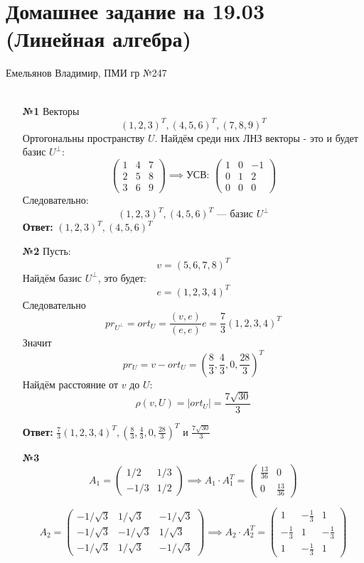 \documentclass[a4paper]{article}
\newcommand{\mat}[1]{\begin{pmatrix} #1 \end{pmatrix}}
\renewcommand{\f}[2]{\frac{#1}{#2}}
\begin{document}
\section*{Домашнее задание на 19.03 (Линейная алгебра)}
 {\large Емельянов Владимир, ПМИ гр №247}\\\\
\begin{enumerate}
    \item[\textbf{№1}]Векторы 
    $$(1, 2, 3)^T, (4, 5, 6)^T, (7, 8, 9)^T$$
    Ортогональны пространству $U$.
     Найдём среди них ЛНЗ векторы - это и будет базис $U^\perp$:
     $$\mat{1 & 4 & 7\\2 & 5 & 8 \\ 3 & 6 & 9} \implies \text{УСВ: } 
     \mat{1 & 0 & -1 \\ 0 & 1 & 2 \\ 0 & 0 & 0}$$
    Следовательно:
    $$(1, 2, 3)^T, (4, 5, 6)^T \text{ --- базис } U^\perp$$
    \textbf{Ответ: } $(1, 2, 3)^T, (4, 5, 6)^T$\\

    \item[\textbf{№2}]Пусть:
    $$v = (5, 6, 7, 8)^T$$
    Найдём базис $U^\perp$, это будет:
    $$e = (1, 2, 3, 4)^T$$
    Следовательно $$pr_{U^\perp}=ort_U = \f{(v, e)}{(e, e)}e = 
    \f{7}{3}\left( 1, 2, 3, 4\right)^T$$
    Значит
    $$pr_U = v-ort_U =\left( \f{8}{3}, \f{4}{3}, 0, \f{28}{3}\right)^T$$
    Найдём расстояние от $v$ до $U$:
    $$\rho(v, U) = |ort_U| = \f{7\sqrt{30}}{3}$$

    \textbf{Ответ:} $\f{7}{3}\left( 1, 2, 3, 4\right)^T, \left( \f{8}{3}, \f{4}{3}, 0, \f{28}{3}\right)^T$ и $ \f{7\sqrt{30}}{3}$

    \item[\textbf{№3}]$$A_1 = \begin{pmatrix}
        1/2 & 1/3 \\
        -1/3 & 1/2
        \end{pmatrix}\implies A_1 \cdot A_1^T = \begin{pmatrix}
        \frac{13}{36} & 0 \\
        0 & \frac{13}{36}
        \end{pmatrix}$$

    $$A_2 = \begin{pmatrix}
        -1/\sqrt{3} & 1/\sqrt{3} & -1/\sqrt{3} \\
        -1/\sqrt{3} & -1/\sqrt{3} & 1/\sqrt{3} \\
        -1/\sqrt{3} & 1/\sqrt{3} & -1/\sqrt{3}
        \end{pmatrix}\implies A_2 \cdot A_2^T = \begin{pmatrix}
        1 & -\frac{1}{3} & 1 \\
        -\frac{1}{3} & 1 & -\frac{1}{3} \\
        1 & -\frac{1}{3} & 1
        \end{pmatrix}$$


\end{enumerate}
\end{document}
